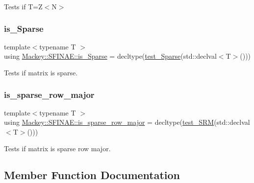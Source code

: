 Tests if T=Z$<$\+N$>$ 

\mbox{\label{structMackey_1_1SFINAE_ab4f05241219d560e2e7cee5215cc37a5}} 
\subsubsection{\texorpdfstring{is\+\_\+\+Sparse}{is\_Sparse}}
{\footnotesize\ttfamily template$<$typename T $>$ \\
using \hyperlink{structMackey_1_1SFINAE_ab4f05241219d560e2e7cee5215cc37a5}{Mackey\+::\+S\+F\+I\+N\+A\+E\+::is\+\_\+\+Sparse} =  decltype(\hyperlink{structMackey_1_1SFINAE_a822455b3ae1980be0801f1ca334b5765}{test\+\_\+\+Sparse}(std\+::declval$<$T$>$()))}



Tests if matrix is sparse. 

\mbox{\label{structMackey_1_1SFINAE_a65dd52a3c2ee8f112260288e6d2f8391}} 
\subsubsection{\texorpdfstring{is\+\_\+sparse\+\_\+row\+\_\+major}{is\_sparse\_row\_major}}
{\footnotesize\ttfamily template$<$typename T $>$ \\
using \hyperlink{structMackey_1_1SFINAE_a65dd52a3c2ee8f112260288e6d2f8391}{Mackey\+::\+S\+F\+I\+N\+A\+E\+::is\+\_\+sparse\+\_\+row\+\_\+major} =  decltype(\hyperlink{structMackey_1_1SFINAE_affbe05b9e94c425333fef47202fd19fc}{test\+\_\+\+S\+RM}(std\+::declval$<$T$>$()))}



Tests if matrix is sparse row major. 



\subsection{Member Function Documentation}
\mbox{\label{structMackey_1_1SFINAE_aa8d24c8b8818ab4d1613a127ad14f758}} 
